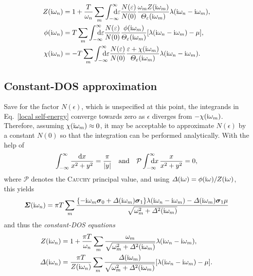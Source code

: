 \begin{subequations} \label{local Eliashberg equations}
   \begin{align}
      Z(\I \omega_n) &= 1 + \frac T {\omega_n} \sum_m
      \int \from{-\infty} \till \infty \D \epsilon \frac{N(\epsilon)}{N(0)}
      \frac{\omega_m Z (\I \omega_m)}{\Theta_\epsilon(\I \omega_m)}
      \lambda(\I \omega_n - \I \omega_m),
      \\
      \phi(\I \omega_n) &= T \sum_m
      \int \from{-\infty} \till \infty \D \epsilon \frac{N(\epsilon)}{N(0)}
      \frac{\phi(\I \omega_m)}{\Theta_\epsilon(\I \omega_m)}
      [\lambda(\I \omega_n - \I \omega_m) - \mu],
      \\
      \chi(\I \omega_n) &= -T \sum_m
      \int \from{-\infty} \till \infty \D \epsilon \frac{N(\epsilon)}{N(0)}
      \frac{\epsilon + \chi(\I \omega_m)}{\Theta_\epsilon(\I \omega_m)}
      \lambda(\I \omega_n - \I \omega_m).
   \end{align}
\end{subequations}

\subsection{Constant-DOS approximation}

Save for the factor $N(\epsilon)$, which is unspecified at this point, the
integrands in Eq.~\ref{local self-energy} converge towards zero as $\epsilon$
diverges from $-\chi(\mathrm i \omega_m)$. Therefore, assuming $\chi(\mathrm i \omega_m)
\approx 0$, it may be acceptable to approximate $N(\epsilon)$ by a constant
$N(0)$ so that the integration can be performed analytically. With the help of
%
\begin{equation*}
    \int_{-\infty}^\infty \frac{\D x}{x^2 + y^2} = \frac \pi {|y|}
    \quad \text{and} \quad
    \mathcal P \int \from{-\infty} \till \infty \D x \, \frac x {x^2 + y^2} = 0,
\end{equation*}
%
where $\mathcal P$ denotes the \textsc{Cauchy} principal value, and using
$\varDelta(\mathrm i \omega) = \phi(\mathrm i \omega) / Z(\mathrm i \omega)$, this yields
%
\begin{equation*}
    \boldsymbol {\varSigma}(\mathrm i \omega_n)
    = \pi T \sum_m \frac{ \{
        - \mathrm i \omega_m \boldsymbol \sigma_0
        + \varDelta(\mathrm i \omega_m) \boldsymbol \sigma_1 \}
        \lambda(\mathrm i \omega_n - \mathrm i \omega_m)
        - \varDelta(\mathrm i \omega_m) \boldsymbol \sigma_1 \mu }
        { \sqrt{\omega_m^2 + \varDelta^2(\mathrm i \omega_m)} }
\end{equation*}
%
and thus the \emph{constant-DOS  equations}
%
\begin{subequations}
    \begin{align}
        Z(\mathrm i \omega_n) &= 1 + \frac{\pi T}{\omega_n} \sum_m
        \frac{\omega_m}{\sqrt{\omega_m^2 + \varDelta^2(\mathrm i \omega_m)}}
        \lambda(\mathrm i \omega_n - \mathrm i \omega_m),
        \\
        \varDelta(\mathrm i \omega_n) &= \frac{\pi T}{Z(\mathrm i \omega_n)} \sum_m
        \frac{\varDelta(\mathrm i \omega_m)}{\sqrt{\omega_m^2 + \varDelta^2(\mathrm i \omega_m)}}
        [\lambda(\mathrm i \omega_n - \mathrm i \omega_m) - \mu].
    \end{align}
\end{subequations}

